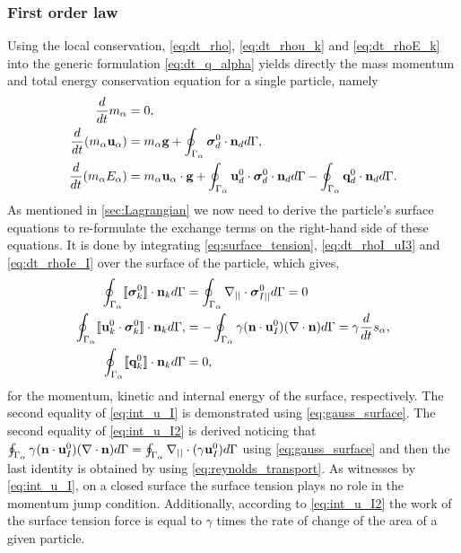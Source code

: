 

\subsubsection{First order law}

Using the local conservation, \ref{eq:dt_rho}, \ref{eq:dt_rhou_k} and \ref{eq:dt_rhoE_k} into the generic formulation \ref{eq:dt_q_alpha} yields directly the mass momentum and total energy conservation equation for a single particle, namely
\begin{align}
    \frac{d}{dt} m_\alpha
    &= 
    0,\\
    \frac{d}{dt} (m_\alpha \textbf{u}_\alpha)
    &= 
    m_\alpha\textbf{g}
    +  \oint_{\Gamma_{\alpha}} \bm{\sigma}_d^0 \cdot \textbf{n}_d d\Gamma,\\
    \frac{d}{dt} (m_\alpha E_\alpha)
    &= 
    m_\alpha \textbf{u}_\alpha \cdot \textbf{g}
    +\oint_{\Gamma_{\alpha}} \textbf{u}_d^0 \cdot \bm{\sigma}_d^0 \cdot  \textbf{n}_d d\Gamma 
    - \oint_{\Gamma_{\alpha}} \textbf{q}_d^0 \cdot \textbf{n}_d d\Gamma. 
\end{align}
As mentioned in \ref{sec:Lagrangian} we now need to derive the particle's surface equations to re-formulate the exchange terms on the right-hand side of these equations. 
It is done by integrating \ref{eq:surface_tension}, \ref{eq:dt_rhoI_uI3} and  \ref{eq:dt_rhoIe_I}  over the surface of the particle, which gives,  
\begin{align}
    \label{eq:int_u_I}
    \oint_{\Gamma_{\alpha}} \llbracket \bm{\sigma}_k^0 \rrbracket \cdot \textbf{n}_k  d\Gamma
    &=
    \oint_{\Gamma_{\alpha}} \mathbf{\nabla}_{||}\cdot\bm\sigma^0_{I||} d\Gamma = 0\\
    \label{eq:int_u_I2}
    \oint_{\Gamma_{\alpha}} \llbracket \textbf{u}_k^0 \cdot \bm{\sigma}_k^0 \rrbracket \cdot \textbf{n}_k d\Gamma,
    &=
    -\oint_{\Gamma_{\alpha}} \gamma(\textbf{n}\cdot \textbf{u}_{I}^0)(\mathbf{\nabla}\cdot \textbf{n}) d\Gamma
    = \gamma \frac{d}{dt} s_\alpha,\\
    \label{eq:int_q_I}
    \oint_{\Gamma_{\alpha}} \llbracket \textbf{q}_k^0 \rrbracket \cdot \textbf{n}_k d\Gamma
    &=
    0,
\end{align}
for the momentum, kinetic and internal energy of the surface, respectively. 
The second equality of \ref{eq:int_u_I} is demonstrated using \ref{eq:gauss_surface}. 
The second equality of \ref{eq:int_u_I2} is derived noticing that $\oint_{\Gamma_{\alpha}} \gamma(\textbf{n}\cdot \textbf{u}_{I}^0)(\mathbf{\nabla}\cdot \textbf{n}) d\Gamma = \oint_{\Gamma_{\alpha}} \mathbf{\nabla}_{||}\cdot (\gamma \textbf{u}_I^0) d\Gamma $ using \ref{eq:gauss_surface} and then the last identity is obtained by using \ref{eq:reynolds_transport}. 
As witnesses by \ref{eq:int_u_I}, on a closed surface the surface tension plays no role in the momentum jump condition.
Additionally, according to \ref{eq:int_u_I2} the work of the surface tension force is equal to $\gamma$ times the rate of change of the area of a given particle. 

